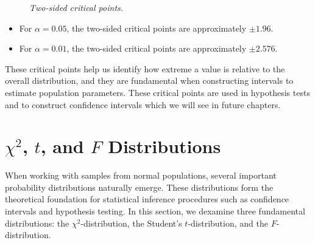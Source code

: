 \documentclass[twoside]{book}
\begin{document}
\begin{figure}[H]
\begin{center}
    \caption{\textit{Two‐sided critical points.}}
\end{center}
\end{figure}

\begin{itemize}
	\item For \(\alpha = 0.05\), the two-sided critical points are approximately \(\pm 1.96\).
	\item For \(\alpha = 0.01\), the two-sided critical points are approximately \(\pm 2.576\).
\end{itemize}

These critical points help us identify how extreme a value is relative to the overall distribution, and they are fundamental when constructing intervals to estimate population parameters. These critical points are used in hypothesis tests and to construct confidence intervals which we will see in future chapters.


\section{$\chi^2$, $t$, and $F$ Distributions}
When working with samples from normal populations, several important probability distributions naturally emerge. These distributions form the theoretical foundation for statistical inference procedures such as confidence intervals and hypothesis testing. In this section, we dexamine three fundamental distributions: the $\chi^2$-distribution, the Student's $ t $-distribution, and the $F$-distribution.
\end{document}
